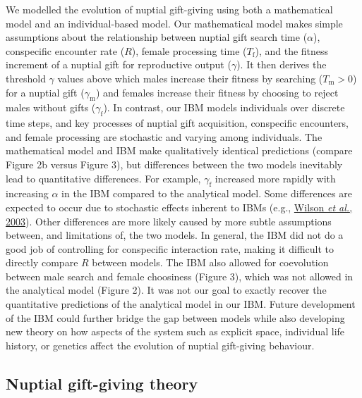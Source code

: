 \documentclass[
]{article}
\begin{document}
We modelled the evolution of nuptial gift-giving using both a
mathematical model and an individual-based model. Our mathematical model
makes simple assumptions about the relationship between nuptial gift
search time (\(\alpha\)), conspecific encounter rate (\(R\)), female
processing time (\(T_{\mathrm{f}}\)), and the fitness increment of a
nuptial gift for reproductive output (\(\gamma\)). It then derives the
threshold \(\gamma\) values above which males increase their fitness by
searching (\(T_{\mathrm{m}} > 0\)) for a nuptial gift
(\(\gamma_{\mathrm{m}}\)) and females increase their fitness by choosing
to reject males without gifts (\(\gamma_{\mathrm{f}}\)). In contrast,
our IBM models individuals over discrete time steps, and key processes
of nuptial gift acquisition, conspecific encounters, and female
processing are stochastic and varying among individuals. The
mathematical model and IBM make qualitatively identical predictions
(compare Figure 2b versus Figure 3), but differences between the two
models inevitably lead to quantitative differences. For example,
\(\gamma_{\mathrm{f}}\) increased more rapidly with increasing
\(\alpha\) in the IBM compared to the analytical model. Some differences
are expected to occur due to stochastic effects inherent to IBMs (e.g.,
\protect\hyperlink{ref-Wilson2003}{Wilson \emph{et al.}, 2003}). Other
differences are more likely caused by more subtle assumptions between,
and limitations of, the two models. In general, the IBM did not do a
good job of controlling for conspecific interaction rate, making it
difficult to directly compare \(R\) between models. The IBM also allowed
for coevolution between male search and female choosiness (Figure 3),
which was not allowed in the analytical model (Figure 2). It was not our
goal to exactly recover the quantitative predictions of the analytical
model in our IBM. Future development of the IBM could further bridge the
gap between models while also developing new theory on how aspects of
the system such as explicit space, individual life history, or genetics
affect the evolution of nuptial gift-giving behaviour.

\hypertarget{nuptial-gift-giving-theory}{%
\subsection{Nuptial gift-giving
theory}\label{nuptial-gift-giving-theory}}
\end{document}
